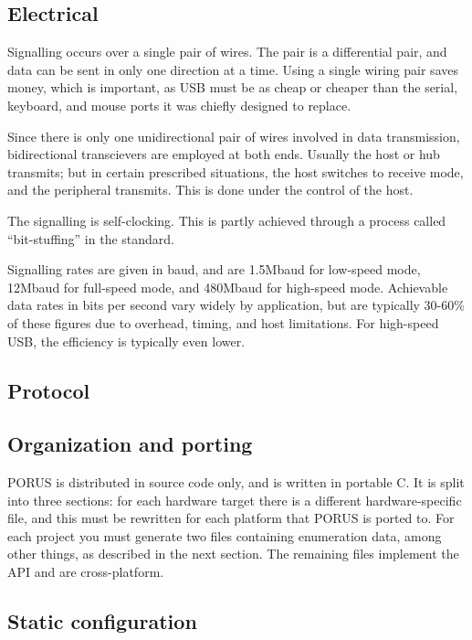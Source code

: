 \documentclass[a4paper]{book}
\newcommand{\porus}{PORUS }
\begin{document}
\subsection{Electrical}

Signalling occurs over a single pair of wires.  The pair is a differential pair, and data can be sent in only one direction at a time.  Using a single wiring pair saves money, which is important, as USB must be as cheap or cheaper than the serial, keyboard, and mouse ports it was chiefly designed to replace.

Since there is only one unidirectional pair of wires involved in data transmission, bidirectional transcievers are employed at both ends.  Usually the host or hub transmits; but in certain prescribed situations, the host switches to receive mode, and the peripheral transmits.  This is done under the control of the host.

The signalling is self-clocking.  This is partly achieved through a process called ``bit-stuffing'' in the standard.

Signalling rates are given in baud, and are 1.5Mbaud for low-speed mode, 12Mbaud for full-speed mode, and 480Mbaud for high-speed mode.  Achievable data rates in bits per second vary widely by application, but are typically 30-60\% of these figures due to overhead, timing, and host limitations.  For high-speed USB, the efficiency is typically even lower.

\subsection{Protocol}



\subsection{Organization and porting}

\porus is distributed in source code only, and is written in portable C.  It is split into three sections: for each hardware target there is a different hardware-specific file, and this must be rewritten for each platform that \porus is ported to.  For each project you must generate two files containing enumeration data, among other things, as described in the next section.  The remaining files implement the API and are cross-platform.

\subsection{Static configuration}
\end{document}
